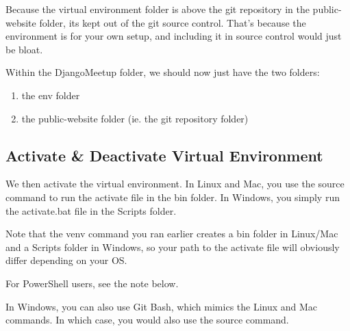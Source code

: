 \documentclass[letterpaper,10pt,english]{sphinxmanual}
\begin{document}
\begin{sphinxVerbatim}[commandchars=\\\{\}]
 
   

 
   
\end{sphinxVerbatim}

Because the virtual environment folder  is above the git repository in the public-website folder, its kept out of the git source control.
That’s because the environment is for your own setup, and including it in source control would just be bloat.

Within the DjangoMeetup folder, we should now just have the two folders:
\begin{enumerate}
\def\theenumi{\arabic{enumi}}
\def\labelenumi{\theenumi .}
\makeatletter\def\p@enumii{\p@enumi \theenumi .}\makeatother
\item {} 
the env folder

\item {} 
the public-website folder (ie. the git repository folder)

\end{enumerate}


\subsection{Activate \& Deactivate Virtual Environment}
\label{\detokenize{guide/03_virtualenv:activate-deactivate-virtual-environment}}
We then activate the virtual environment.  In Linux and Mac, you use the source command to run the activate file in the bin folder.  In Windows, you simply run the activate.bat file in the Scripts folder.

Note that the venv command you ran earlier creates a bin folder in Linux/Mac and a Scripts folder in Windows, so your path to the activate file will obviously differ depending on your OS.

For PowerShell users, see the note below.

In Windows, you can also use Git Bash, which mimics the Linux and Mac commands.  In which case, you would also use the source command.

\begin{sphinxVerbatim}[commandchars=\\\{\}]
   
 

 
\PYGZbs{}\PYGZbs{}

   
 
\end{sphinxVerbatim}
\end{document}
